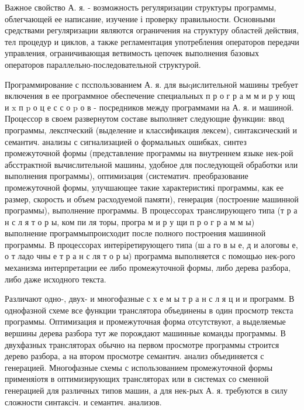 \documentclass[10pt]{article}
\begin{document}
Важное свойство А. я. - возможность регуляризации структуры программы, облегчающей ее написание, изучение і проверку правильности. Основными средствами регуляризации являются ограничения на структуру областей действия, тел процедур и циклов, а также регламентация употребления операторов передачи управления, ограничивающая ветвимость цепочек выполнения базовых операторов параллельно-последовательной структурой.



Программирование с псспользованием А. я. для выqислительной машины требует включения в ее программное обеспечение специальных п р о г р а м м и р у ющ и $\mathrm{x}$ п $\mathrm{p}$ о ц е с с о $\mathrm{p}$ о в - посредников между программами на А. я. и машиной. Процессор в своем развернутом составе выполняет следующие функции: ввод программы, лекспческий (выделение и классификация лексем), синтаксический и семантич. анализы с сигнализацией о формальных ошибках, синтез промежуточной формы (представление программы на внутреннем языке нек-рой абсстрактной вычислительной машины, удобное для последующей обработки или выполнения программы), оптимизация (систематич. преобразование промежуточной формы, улучшающее такие характеристикі программы, как ее размер, скорость и объем расходуемой памяти), генерация (построение машинной программы), выполнение программы. В процессорах транслирующего типа (т р а н с л я т о р ы, ком пи ля торы, програ м и р у щи п р о г р а м м ы) выполнение программыпроисходит после полного построения машинной программы. В процессорах интеріретирующего типа (ш а го в ы е, д и алоговы е, о т ладо чны е т р а н с ля т о р ы) программа выполняется с помощью нек-рого механизма интерпретации ее либо промежуточной формы, либо дерева разбора, либо даже исходного текста.



Различают одно-, двух- и многофазные с х е м ы т р а н с л я ц и и программ. В однофазной схеме все функции транслятора объединены в один просмотр текста программы. Оптимизация и промежуточная форма отсутствуют, а выделяемые вершины дерева разбора тут же порождают машинные команды программы. В двухфазных трансляторах обычно на первом просмотре программы строится дерево разбора, а на втором просмотре семантич. анализ объединяется с генерацией. Многофазные схемы с использованием промежуточной формы применяіотя в оптимизирующих трансляторах или в системах со сменной генерацией для различных типов машин, а для нек-рых А. я. требуются в силу сложности синтаксіч. и семантич. анализов.
\end{document}

